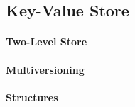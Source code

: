 \subsection{Key-Value Store}

\paragraph{Two-Level Store}

\paragraph{Multiversioning}

\paragraph{Structures}
